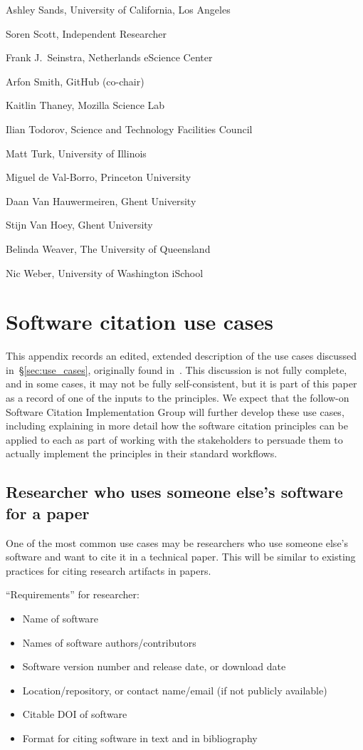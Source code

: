 \documentclass[12pt, oneside]{amsart}
\begin{document}
Ashley Sands, University of California, Los Angeles

Soren Scott, Independent Researcher

Frank J.~Seinstra, Netherlands eScience Center

Arfon Smith, GitHub (co-chair)

Kaitlin Thaney, Mozilla Science Lab

Ilian Todorov, Science and Technology Facilities Council

Matt Turk, University of Illinois

Miguel de Val-Borro, Princeton University

Daan Van Hauwermeiren, Ghent University

Stijn Van Hoey, Ghent University

Belinda Weaver, The University of Queensland

Nic Weber, University of Washington iSchool

\section{Software citation use cases}
\label{app:usecases}

This appendix records an edited, extended description of the use cases
discussed in~\S\ref{sec:use_cases}, originally found in~\cite{SC-Use-Cases}.
This discussion is not fully complete, and in some cases, it may not be fully
self-consistent, but it is part of this paper as a record of one of the inputs
to the principles. We expect that the follow-on Software Citation
Implementation Group will further develop these use cases, including explaining
in more detail how the software citation principles can be applied
to each as part of working with the stakeholders to persuade them to actually
implement the principles in their standard workflows.


\subsection{Researcher who uses someone else's software for a paper}

One of the most common use cases may be researchers who use someone else's software and want to cite it in a technical paper.
This will be similar to existing practices for citing research artifacts in papers.

``Requirements'' for researcher:
\begin{itemize}
\item Name of software
\item Names of software authors/contributors
\item Software version number and release date, or download date
\item Location/repository, or contact name/email (if not publicly available)
\item Citable DOI of software
\item Format for citing software in text and in bibliography
\end{itemize}
\end{document}
